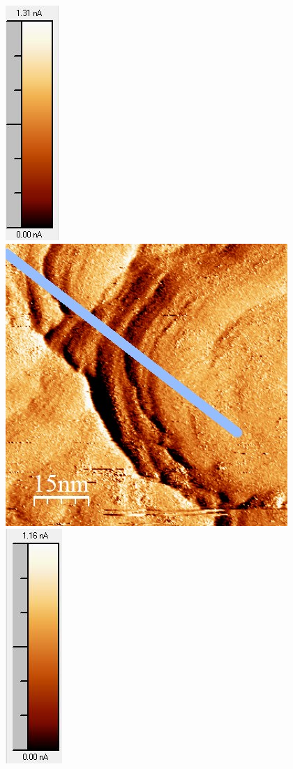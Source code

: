 \documentclass[12pt,a4paper]{article}
\begin{document}
\begin{figure}[H]
\includegraphics[scale=0.6]{Bilder/Anhang/IGain/Strom/1000_IGain_Strom_vor_Skala.jpg}
\includegraphics[scale=0.6]{Bilder/Anhang/IGain/Strom/1000_IGain_Strom_nach.jpg}
\includegraphics[scale=0.6]{Bilder/Anhang/IGain/Strom/1000_IGain_Strom_nach_Skala.jpg}

\end{figure}
\end{document}
